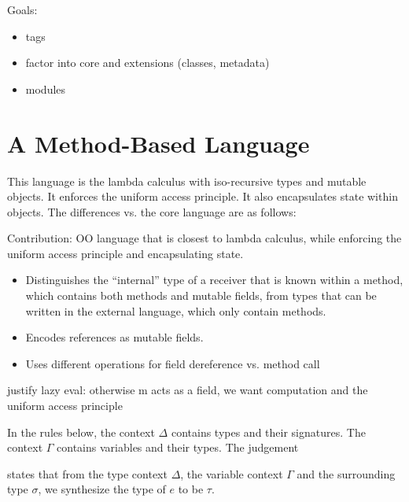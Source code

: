 Goals:

\begin{itemize}

  \item tags
  \item factor into core and extensions (classes, metadata)
  \item modules

\end{itemize}

\section{A Method-Based Language}

This language is the lambda calculus with iso-recursive types and mutable objects.  It enforces the uniform access principle.  It also encapsulates state within objects.  The differences vs. the core language are as follows:

Contribution: OO language that is closest to lambda calculus, while enforcing the uniform access principle and encapsulating state.

\begin{itemize}

 \item Distinguishes the ``internal'' type of a receiver that is known within a method, which contains both methods and mutable fields, from types that can be written in the external language, which only contain methods.
 
 \item Encodes references as mutable fields.
 
 \item Uses different operations for field dereference vs. method call

\end{itemize}

justify lazy eval: otherwise m acts as a field, we want computation and the uniform access principle

In the rules below, the context $\Delta$ contains types and their signatures. The context $\Gamma$ contains variables and their types. 
The judgement 


states that from the type context $\Delta$, the variable context $\Gamma$ and the surrounding type $\sigma$, we synthesize the type of $e$ to be $\tau$.



